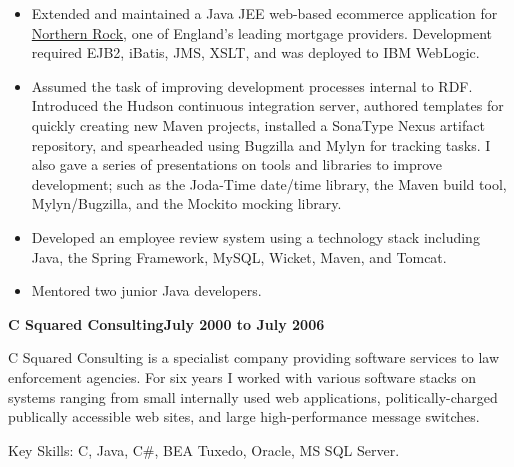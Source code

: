\documentclass[a4paper,12pt]{article}
\newcommand{\jobheld}[2]{\textbf{#1\hfill #2}\nopagebreak}
\newcommand{\keyskills}[1]{\vspace{10pt}Key Skills: #1.}
\begin{document}
\begin{itemize}
\item Extended and maintained a Java JEE web-based ecommerce application for \href{http://www.northernrock.co.uk}{Northern Rock}, one of England's leading mortgage providers.  Development required EJB2, iBatis, JMS, XSLT, and was deployed to IBM WebLogic.

\item Assumed the task of improving development processes internal to RDF. Introduced the Hudson continuous integration server, authored templates for quickly creating new Maven projects, installed a SonaType Nexus artifact repository, and spearheaded using Bugzilla and Mylyn for tracking tasks.  I also gave a series of presentations on tools and libraries to improve development; such as the Joda-Time date/time library, the Maven build tool, Mylyn/Bugzilla,  and the Mockito mocking library. 

\item Developed an employee review system using a technology stack including Java, the Spring Framework, MySQL, Wicket, Maven, and Tomcat.

\item Mentored two junior Java developers.

\end{itemize}

\jobheld{C Squared Consulting}{July 2000 to July 2006}

C Squared Consulting is a specialist company providing software services to law enforcement agencies.  For six years I worked with various software stacks on systems ranging from small internally used web applications, politically-charged publically accessible web sites, and large high-performance message switches.

\keyskills{C, Java, C\#, BEA Tuxedo, Oracle, MS SQL Server}
\end{document}
